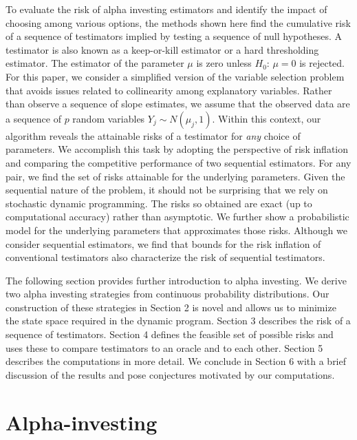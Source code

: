 \documentclass[12pt]{article}
\begin{document}
 To evaluate the risk of alpha investing estimators and identify the impact of choosing
 among various options, the methods shown here find the cumulative risk of a sequence of
 testimators implied by testing a sequence of null hypotheses.  A testimator is also known
 as a keep-or-kill estimator or a hard thresholding estimator.  The estimator of the
 parameter $\mu$ is zero unless $H_0: \,\mu = 0$ is rejected.  For this paper, we consider
 a simplified version of the variable selection problem that avoids issues related to
 collinearity among explanatory variables.  Rather than observe a sequence of slope
 estimates, we assume that the observed data are a sequence of $p$ random variables $Y_j
 \sim N(\mu_j,1)$.  Within this context, our algorithm reveals the attainable risks of a
 testimator for {\em any} choice of parameters.  We accomplish this task by adopting the
 perspective of risk inflation and comparing the competitive performance of two sequential
 estimators.  For any pair, we find the set of risks attainable for the underlying
 parameters.  Given the sequential nature of the problem, it should not be surprising that
 we rely on stochastic dynamic programming.  The risks so obtained are exact (up to
 computational accuracy) rather than asymptotic.  We further show a probabilistic model
 for the underlying parameters that approximates those risks.  Although we consider
 sequential estimators, we find that bounds for the risk inflation of conventional
 testimators also characterize the risk of sequential testimators.


 The following section provides further introduction to alpha investing.  We
 derive two alpha investing strategies from continuous probability
 distributions.  Our construction of these strategies in Section 2 is novel and
 allows us to minimize the state space required in the dynamic program.  Section
 3 describes the risk of a sequence of testimators.  Section 4 defines the
 feasible set of possible risks and uses these to compare
 testimators to an oracle and to each other.  Section 5 describes the
 computations in more detail.  We conclude in Section 6 with a brief discussion
 of the results and pose conjectures motivated by our computations.



\section{ Alpha-investing }
\end{document}
